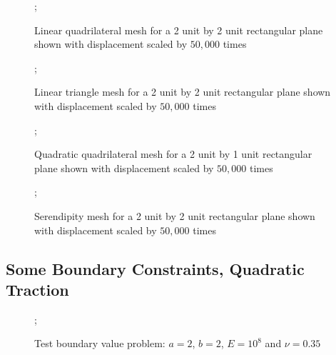 \documentclass{article}
\begin{document}
\begin{figure}
    ;
    \caption{Linear quadrilateral mesh for a 2 unit by 2 unit rectangular plane shown with displacement scaled by $50,000$ times}
\centering
\end{figure}

\begin{figure}
    ;
    \caption{Linear triangle mesh for a 2 unit by 2 unit rectangular plane shown with displacement scaled by $50,000$ times}
\centering
\end{figure}

\begin{figure}
    ;
    \caption{Quadratic quadrilateral mesh for a 2 unit by 1 unit rectangular plane shown with displacement scaled by $50,000$ times}
\centering
\end{figure}


\begin{figure}
    ;
    \caption{Serendipity mesh for a 2 unit by 2 unit rectangular plane shown with displacement scaled by $50,000$ times}
\centering
\end{figure}

\FloatBarrier
\subsection{Some Boundary Constraints,  Quadratic Traction}
\FloatBarrier

\begin{figure}
    ;
    \caption{Test boundary value problem: $a = 2$, $b = 2$, $E = 10^8$ and $\nu = 0.35$}
\centering
\end{figure}
\end{document}
